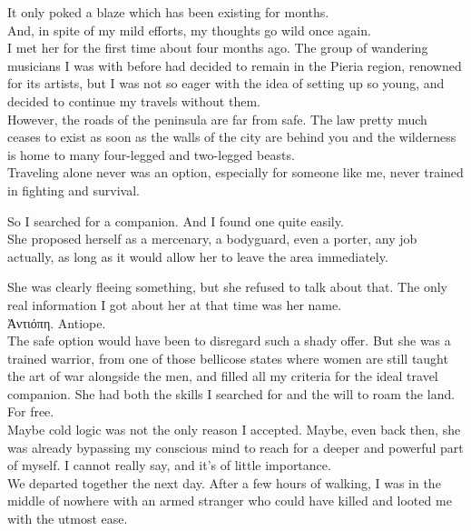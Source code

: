 \documentclass{report}
\begin{document}
It only poked a blaze which has been existing for months.\\

And, in spite of my mild efforts, my thoughts go wild once again.\\

I met her for the first time about four months ago. The group of wandering musicians I was with before had decided to remain in the Pieria region, renowned for its artists, but I was not so eager with the idea of setting up so young, and decided to continue my travels without them.\\

However, the roads of the peninsula are far from safe. The law pretty much ceases to exist as soon as the walls of the city are behind you and the wilderness is home to many four-legged and two-legged beasts.\\

Traveling alone never was an option, especially for someone like me, never trained in fighting and survival.

So I searched for a companion. And I found one quite easily.\\

She proposed herself as a mercenary, a bodyguard, even a porter, any job actually, as long as it would allow her to leave the area immediately.

She was clearly fleeing something, but she refused to talk about that. The only real information I got about her at that time was her name.\\

\foreignlanguage{greek}{Ἀντιόπη}. Antiope.\\

The safe option would have been to disregard such a shady offer. But she was a trained warrior, from one of those bellicose states where women are still taught the art of war alongside the men, and filled all my criteria for the ideal travel companion. She had both the skills I searched for and the will to roam the land. For free.\\

Maybe cold logic was not the only reason I accepted. Maybe, even back then, she was already bypassing my conscious mind to reach for a deeper and powerful part of myself. I cannot really say, and it's of little importance.\\

We departed together the next day. After a few hours of walking, I was in the middle of nowhere with an armed stranger who could have killed and looted me with the utmost ease.\\
\end{document}
